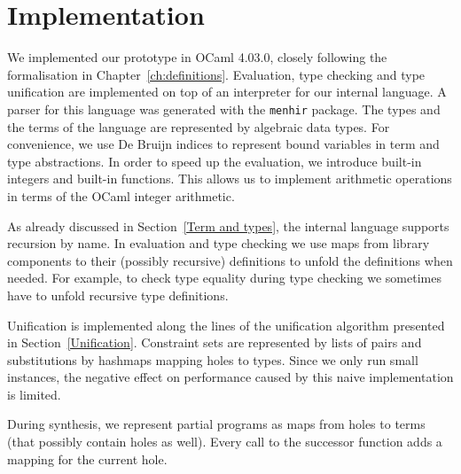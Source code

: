 \chapter{Implementation} \label{ch:implementation}

We implemented our prototype in OCaml 4.03.0, closely following the formalisation in Chapter~\ref{ch:definitions}.  Evaluation, type checking and type unification are implemented on top of an interpreter for our internal language.  A parser for this language was generated with the \lstinline!menhir! package.  The types and the terms of the language are represented by algebraic data types.  For convenience, we use De Bruijn indices \cite{DEBRUIJN1972381} to represent bound variables in term and type abstractions.  In order to speed up the evaluation, we introduce built-in integers and built-in functions.  This allows us to implement arithmetic operations in terms of the OCaml integer arithmetic.

As already discussed in Section~\ref{Term and types}, the internal language supports recursion by name.  In evaluation and type checking we use maps from library components to their (possibly recursive) definitions to unfold the definitions when needed.  For example, to check type equality during type checking we sometimes have to unfold recursive type definitions.

Unification is implemented along the lines of the unification algorithm presented in Section~\ref{Unification}. Constraint sets are represented by lists of pairs and substitutions by hashmaps mapping holes to types. Since we only run small instances, the negative effect on performance caused by this naive implementation is limited.

During synthesis, we represent partial programs as maps from holes to terms (that possibly contain holes as well). Every call to the successor function adds a mapping for the current hole.



